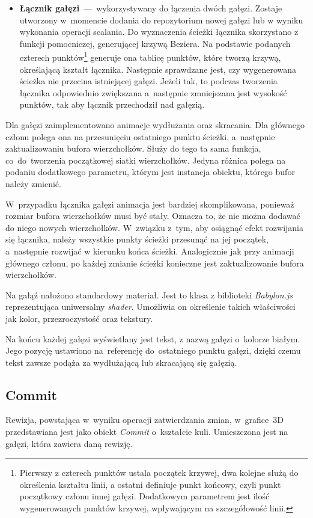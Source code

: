 \documentclass[12pt,a4paper,polish,thesis]{dcsbook}
\begin{document}
{\begin{itemize}
		\item \textbf{Łącznik gałęzi}~---~wykorzystywany do łączenia dwóch gałęzi. Zostaje utworzony w~momencie dodania do repozytorium nowej gałęzi lub w wyniku wykonania operacji scalania. Do wyznaczenia ścieżki łącznika skorzystano z funkcji pomocniczej, generującej krzywą Beziera. Na podstawie podanych czterech punktów\footnote{Pierwszy z czterech punktów ustala początek krzywej, dwa kolejne służą do określenia kształtu linii, a ostatni definiuje punkt końcowy, czyli punkt początkowy członu innej gałęzi. Dodatkowym parametrem jest ilość wygenerowanych punktów krzywej, wpływającym na szczegółowość linii.} generuje ona tablicę punktów, które tworzą krzywą, określającą kształt łącznika. Następnie sprawdzane jest, czy wygenerowana ścieżka nie przecina istniejącej gałęzi. Jeżeli tak, to podczas tworzenia łącznika odpowiednio zwiększana a~następnie zmniejszana jest wysokość punktów, tak aby łącznik przechodził nad gałęzią.
		
	\end{itemize}

	Dla gałęzi zaimplementowano animacje wydłużania oraz skracania. Dla głównego członu polega ona na przesunięciu ostatniego punktu ścieżki, a~następnie zaktualizowaniu bufora wierzchołków. Służy do tego ta sama funkcja, co~do~tworzenia początkowej siatki wierzchołków. Jedyna różnica polega na podaniu dodatkowego parametru, którym jest instancja obiektu, którego bufor należy zmienić. 
	
	W~przypadku łącznika gałęzi animacja jest bardziej skomplikowana, ponieważ rozmiar bufora wierzchołków musi być stały. Oznacza to, że nie można dodawać do niego nowych wierzchołków. W~związku z~tym, aby osiągnąć efekt rozwijania się łącznika, należy wszystkie punkty ścieżki przesunąć na jej początek, a~następnie rozwijać w kierunku końca ścieżki. Analogicznie jak przy animacji głównego członu, po każdej zmianie ścieżki konieczne jest zaktualizowanie bufora wierzchołków.

	Na gałąź nałożono standardowy materiał. Jest to klasa z biblioteki \textit{Babylon.js} reprezentująca uniwersalny \textit{shader}.  Umożliwia on określenie takich właściwości jak kolor, przezroczystość oraz tekstury.

	Na końcu każdej gałęzi wyświetlany jest tekst, z nazwą gałęzi o~kolorze białym. Jego pozycję ustawiono na~referencję do~ostatniego punktu gałęzi, dzięki czemu tekst zawsze podąża za wydłużającą lub skracającą się gałęzią.


	\subsection{Commit}
	Rewizja, powstająca w~wyniku operacji zatwierdzania zmian, w~grafice~3D przedstawiana jest jako obiekt \textit{Commit} o~kształcie kuli. Umieszczona jest na gałęzi, która zawiera daną rewizję.

}
\end{document}
